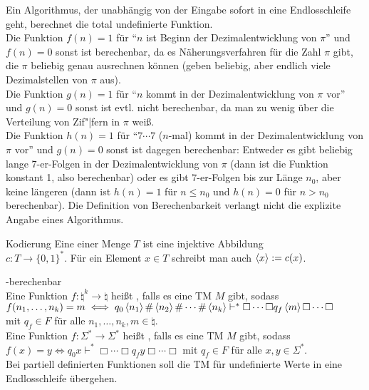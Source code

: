 \begin{Bsp}
    Ein Algorithmus, der unabhängig von der Eingabe sofort in eine Endlosschleife geht,
    berechnet die total undefinierte Funktion.\\
    Die Funktion $f(n) = 1$ für "`$n$ ist Beginn der Dezimalentwicklung von $\pi$"' und $f(n) = 0$
    sonst ist berechenbar, da es Näherungsverfahren für die Zahl $\pi$ gibt, die $\pi$ beliebig
    genau ausrechnen können
    (geben beliebig, aber endlich viele Dezimalstellen von $\pi$ aus).\\
    Die Funktion $g(n) = 1$ für "`$n$ kommt in der Dezimalentwicklung von $\pi$ vor"' und $g(n) = 0$
    sonst ist evtl. nicht berechenbar, da man zu wenig über die Verteilung von Zif"|fern in $\pi$
    weiß.\\
    Die Funktion $h(n) = 1$ für "`$7 \dotsb 7$ ($n$-mal) kommt in der Dezimalentwicklung von $\pi$
    vor"' und $g(n) = 0$ sonst ist dagegen berechenbar:
    Entweder es gibt beliebig lange $7$-er-Folgen in der Dezimalentwicklung von $\pi$
    (dann ist die Funktion konstant 1, also berechenbar)
    oder es gibt $7$-er-Folgen bis zur Länge $n_0$, aber keine längeren
    (dann ist $h(n) = 1$ für $n \le n_0$ und $h(n) = 0$ für $n > n_0$ berechenbar).
    Die Definition von Berechenbarkeit verlangt nicht die explizite Angabe eines Algorithmus.
\end{Bsp}

\linie

\begin{Def}{Kodierung}
    Eine  einer Menge $T$ ist eine injektive Abbildung\\
    $c\colon T \rightarrow \{0, 1\}^\ast$.
    Für ein Element $x \in T$ schreibt man auch $\left\langle x\right\rangle := c(x)$.
\end{Def}

\begin{Def}{-berechenbar}\\
    Eine Funktion $f\colon \natural^k \rightarrow \natural$ heißt
    , falls es eine TM $M$ gibt, sodass\\
    $f(n_1, \dotsc, n_k) = m \iff q_0 \left\langle n_1\right\rangle \# \left\langle n_2\right\rangle \# \dotsb \# \left\langle n_k\right\rangle \vdash^\ast
    \Box \dotsb \Box q_f \left\langle m\right\rangle \Box \dotsb \Box$\\
    mit $q_f \in F$ für alle $n_1, \dotsc, n_k, m \in \natural$.\\
    Eine Funktion $f\colon \Sigma^\ast \rightarrow \Sigma^\ast$ heißt
    , falls es eine TM $M$ gibt, sodass\\
    $f(x) = y \iff q_0 x \vdash^\ast \Box \dotsb \Box q_f y \Box \dotsb \Box$
    mit $q_f \in F$ für alle $x, y \in \Sigma^\ast$.\\
    Bei partiell definierten Funktionen soll die TM für undefinierte Werte in eine
    Endlosschleife übergehen.
\end{Def}

